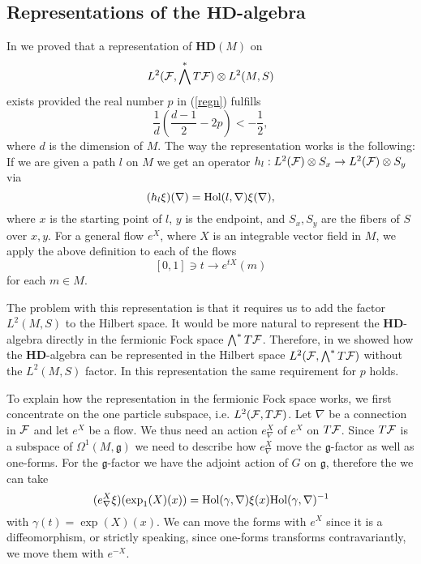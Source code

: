\documentclass[letterpaper,12pt]{article}
\def\cf{{\cal F}}
\begin{document}
\subsection{Representations of the $\mathbf{HD}$-algebra}





In \cite{Aastrup:2017vrm} we proved that a representation of $\mathbf{HD}(M)$ on $$L^2 (\cf ,\bigwedge^* T\cf)\otimes L^2(M,S)  $$ exists provided the real number $p$ in (\ref{regn}) fulfills 
\begin{equation}\frac{1}{d} \left( \frac{d-1}{2}-2p\right)<-\frac12 , \label{betingelse}
\end{equation}
where $d$ is the dimension of $M$.
The way the representation works is the following: If we are given a path $l$ on $M$ we get an operator $h_l : L^2 (\cf)\otimes S_x \to L^2 (\cf)\otimes S_y$ via
$$(h_l\xi) (\nabla)=\hbox{Hol} (l,\nabla )\xi (\nabla) ,$$
where $x$ is the starting point of $l$, $y$ is the endpoint, and $S_x,S_y$ are the fibers of $S$ over $x,y$.
For a general flow $e^X$, where $X$ is an integrable vector field in $M$, we apply the above definition to each of the flows 
$$[0,1]\ni t\to e^{tX}(m) $$
for each $m\in M$.

The problem with this representation is that it requires us to add the factor $L^2(M,S)$ to the Hilbert space. It would be more natural to represent the $\mathbf{HD}$-algebra directly in the fermionic Fock space $\bigwedge^* T\cf$. 
Therefore, in \cite{Aastrup:2018coc} we showed how the $\mathbf{HD}$-algebra can be represented in the Hilbert space $L^2(\cf, \bigwedge^* T\cf)$ without the $L^2(M,S)$ factor. In this representation the same requirement for $p$ holds.






 
 To explain how the representation in the fermionic Fock space works, we first concentrate on the one particle subspace, i.e. $L^2(\cf, T\cf)$. Let $\nabla$ be a connection in $\cf$ and let $e^X$ be a flow. We thus need an action $e^X_\nabla$ of $e^X$ on $T\cf$. Since $T\cf$ is a subspace of $\Omega^1(M,\mathfrak{g})$ we need to describe how $e^X_\nabla$ move the $\mathfrak{g}$-factor as well as one-forms. For the $\mathfrak{g}$-factor we have the adjoint action of $G$ on $\mathfrak{g}$, therefore the we can take
 $$(e^X_\nabla \xi )(\exp_1(X)(x))=\hbox{Hol}(\gamma , \nabla) \xi (x) \hbox{Hol}(\gamma , \nabla)^{-1}$$
 with $\gamma(t)=\exp (X)(x)$.  We can move the forms with $e^X$ since it is a diffeomorphism, or strictly speaking, since one-forms transforms contravariantly, we move them with $e^{-X}$. 
 
\end{document}
